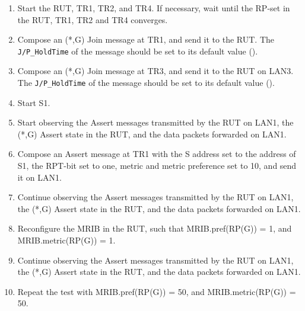\documentclass[11pt]{report}
\begin{document}

\begin{enumerate}

  \item Start the RUT, TR1, TR2, and TR4. If necessary, wait until the RP-set
  in the RUT, TR1, TR2 and TR4 converges.

  \item Compose an (*,G) Join message at TR1, and send it to the RUT.
  The \verb=J/P_HoldTime= of the message should be set to its default
  value ({\PimsmJPHoldTime}).

  \item Compose an (*,G) Join message at TR3, and send it to the RUT on LAN3.
  The \verb=J/P_HoldTime= of the message should be set to its default
  value ({\PimsmJPHoldTime}).

  \item Start S1.

  \item Start observing the Assert messages transmitted by the RUT on
  LAN1, the (*,G) Assert state in the RUT, and the data packets forwarded on
  LAN1.

  \item Compose an Assert message at TR1 with the S address set to the
  address of S1, the RPT-bit set to one, metric and metric preference set to
  10, and send it on LAN1.

  \item Continue observing the Assert messages transmitted by the RUT on
  LAN1, the (*,G) Assert state in the RUT, and the data packets forwarded on
  LAN1.

  \item Reconfigure the MRIB in the RUT, such that MRIB.pref(RP(G)) = 1, and
  MRIB.metric(RP(G)) = 1.

  \item Continue observing the Assert messages transmitted by the RUT on
  LAN1, the (*,G) Assert state in the RUT, and the data packets forwarded on
  LAN1.

  \item Repeat the test with MRIB.pref(RP(G)) = 50,
  and MRIB.metric(RP(G)) = 50.

\end{enumerate}

\end{document}
